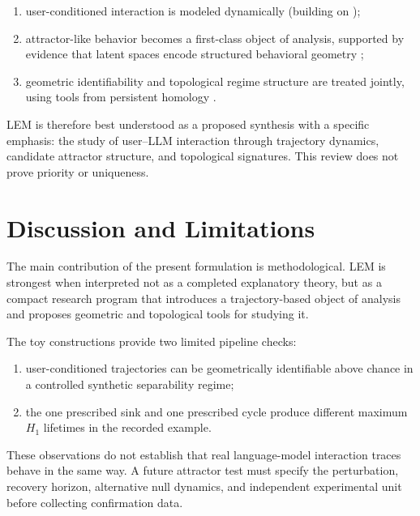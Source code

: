 \documentclass[11pt]{article}
\begin{document}
\begin{enumerate}[leftmargin=1.8em]
  \item user-conditioned interaction is modeled dynamically (building on
        \cite{wang2025attractorcycles,ramsauer2021hopfield,bai2019deq});
  \item attractor-like behavior becomes a first-class object of analysis, supported
        by evidence that latent spaces encode structured behavioral geometry
        \cite{chen2025persona,bricken2023monosemanticity};
  \item geometric identifiability and topological regime structure are treated
        jointly, using tools from persistent homology
        \cite{carlsson2009topology,gardinazzi2024persistent}.
\end{enumerate}

LEM is therefore best understood as a proposed synthesis with a specific emphasis:
the study of user--LLM interaction through trajectory dynamics, candidate attractor
structure, and topological signatures. This review does not prove priority or
uniqueness.


\section{Discussion and Limitations}

The main contribution of the present formulation is methodological. LEM is strongest
when interpreted not as a completed explanatory theory, but as a compact research
program that introduces a trajectory-based object of analysis and proposes geometric
and topological tools for studying it.

The toy constructions provide two limited pipeline checks:

\begin{enumerate}[leftmargin=1.8em]
  \item user-conditioned trajectories can be geometrically identifiable above chance
        in a controlled synthetic separability regime;
  \item the one prescribed sink and one prescribed cycle produce different
        maximum $H_1$ lifetimes in the recorded example.
\end{enumerate}

These observations do not establish that real language-model interaction traces
behave in the same way. A future attractor test must specify the perturbation,
recovery horizon, alternative null dynamics, and independent experimental unit
before collecting confirmation data.
\end{document}
